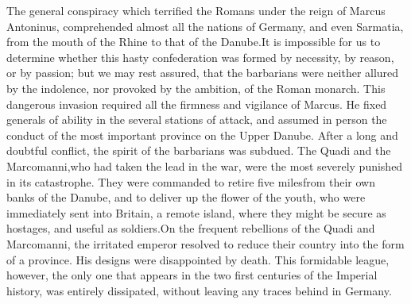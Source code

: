 
The general conspiracy which terrified the Romans under the reign
of Marcus Antoninus, comprehended almost all the nations of
Germany, and even Sarmatia, from the mouth of the Rhine to that
of the Danube.\footnotemark[82] It is impossible for us to determine whether
this hasty confederation was formed by necessity, by reason, or
by passion; but we may rest assured, that the barbarians were
neither allured by the indolence, nor provoked by the ambition,
of the Roman monarch. This dangerous invasion required all the
firmness and vigilance of Marcus. He fixed generals of ability in
the several stations of attack, and assumed in person the conduct
of the most important province on the Upper Danube. After a long
and doubtful conflict, the spirit of the barbarians was subdued.
The Quadi and the Marcomanni,\footnotemark[83] who had taken the lead in the
war, were the most severely punished in its catastrophe. They
were commanded to retire five miles\footnotemark[84] from their own banks of
the Danube, and to deliver up the flower of the youth, who were
immediately sent into Britain, a remote island, where they might
be secure as hostages, and useful as soldiers.\footnotemark[85] On the frequent
rebellions of the Quadi and Marcomanni, the irritated emperor
resolved to reduce their country into the form of a province. His
designs were disappointed by death. This formidable league,
however, the only one that appears in the two first centuries of
the Imperial history, was entirely dissipated, without leaving
any traces behind in Germany.




